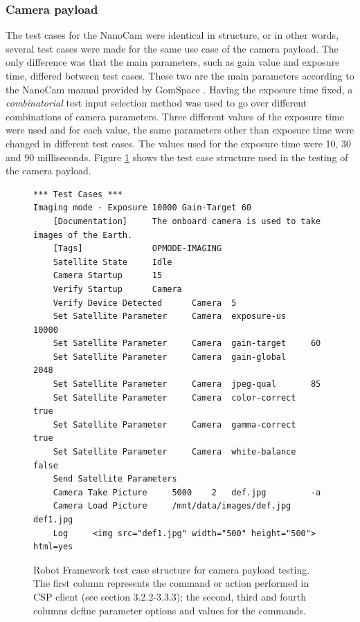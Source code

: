 \documentclass[english,12pt,a4paper,pdftex,elec,utf8]{aaltothesis}
\begin{document}
\subsubsection{Camera payload}
The test cases for the NanoCam were identical in structure, or in other words, several test cases were made for the same use case of the camera payload. The only difference was that the main parameters, such as gain value and exposure time, differed between test cases. These two are the main parameters according to the NanoCam manual provided by GomSpace \cite{nanocamds}. Having the exposure time fixed, a \textit{combinatorial} test input selection method was used to go over different combinations of camera parameters. Three different values of the exposure time were used and for each value, the same parameters other than exposure time were changed in different test cases. The values used for the exposure time were 10, 30 and 90 milliseconds. Figure \ref{robotcamera} shows the test case structure used in the testing of the camera payload.\par
\begin{figure}[h!]
\centering
\begin{verbatim}
*** Test Cases ***
Imaging mode - Exposure 10000 Gain-Target 60
	[Documentation]		The onboard camera is used to take images of the Earth.
	[Tags]				OPMODE-IMAGING
	Satellite State		Idle
	Camera Startup		15
	Verify Startup		Camera
	Verify Device Detected		Camera 	5
	Set Satellite Parameter		Camera	exposure-us		10000
	Set Satellite Parameter		Camera	gain-target		60
	Set Satellite Parameter		Camera	gain-global		2048
	Set Satellite Parameter		Camera	jpeg-qual		85
	Set Satellite Parameter		Camera	color-correct	true
	Set Satellite Parameter		Camera	gamma-correct	true
	Set Satellite Parameter		Camera	white-balance	false
	Send Satellite Parameters
	Camera Take Picture		5000	2	def.jpg 		-a
	Camera Load Picture		/mnt/data/images/def.jpg	def1.jpg
	Log		<img src="def1.jpg" width="500" height="500">	html=yes
\end{verbatim}
\caption{Robot Framework test case structure for camera payload testing. The first column represents the command or action performed in CSP client (see section 3.2.2-3.3.3); the second, third and fourth columns define parameter options and values for the commands.}
\label{robotcamera}
\end{figure}
\end{document}
